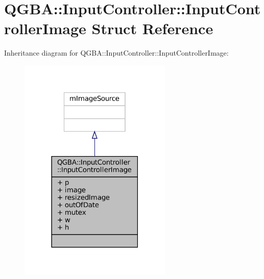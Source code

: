 \hypertarget{struct_q_g_b_a_1_1_input_controller_1_1_input_controller_image}{}\section{Q\+G\+BA\+:\+:Input\+Controller\+:\+:Input\+Controller\+Image Struct Reference}
\label{struct_q_g_b_a_1_1_input_controller_1_1_input_controller_image}


Inheritance diagram for Q\+G\+BA\+:\+:Input\+Controller\+:\+:Input\+Controller\+Image\+:
\nopagebreak
\begin{figure}[H]
\begin{center}
\leavevmode
\includegraphics[width=206pt]{struct_q_g_b_a_1_1_input_controller_1_1_input_controller_image__inherit__graph}
\end{center}
\end{figure}


